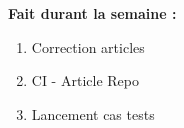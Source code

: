 \textbf{Fait durant la semaine :}
\begin{enumerate}[label=\textbullet]
	\item Correction articles
	\item CI - Article Repo
	\item Lancement cas tests
\end{enumerate}